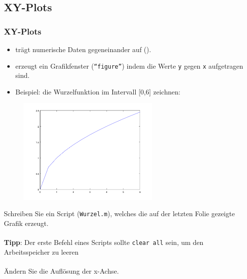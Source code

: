       \subsection{XY-Plots}
      \begin{frame}
          \frametitle{XY-Plots}

          \vspace{-0.5cm}

          \begin{itemize}
              \item {} trägt numerische Daten gegeneinander auf ().
              \item {} erzeugt ein Grafikfenster (\texttt{``figure''}) indem die Werte \texttt{y} gegen \texttt{x} aufgetragen sind.
              \item Beispiel: die Wurzelfunktion im Intervall [0,6] zeichnen:
          \end{itemize}

          \vspace{-0.3cm}

          \begin{figure}
              \includegraphics[width=7.0cm]{example2_1.png}
          \end{figure}
      \end{frame}

      \secMexercise
      \begin{frame}
          \frameMexercise
          \begin{exercise}
              \sloppy
              Schreiben Sie ein Script (\texttt{Wurzel.m}), welches die auf der letzten Folie gezeigte Grafik erzeugt.\\ \\

              \textbf{Tipp}: Der erste Befehl eines Scripts sollte \texttt{clear all} sein, um den Arbeitsspeicher zu leeren\\ \\

              Ändern Sie die Auflösung der x-Achse.
          \end{exercise}
      \end{frame}

